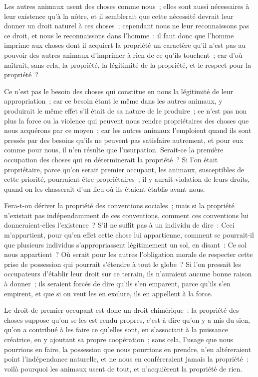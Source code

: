 \documentclass[french,twoside]{book} %
\newcommand\chaptercont{} %
\begin{document}
\chaptercont
\noindent Les autres animaux usent des choses comme nous ; elles sont aussi nécessaires à leur existence qu’à la nôtre, et il semblerait que cette nécessité devrait leur donner un droit naturel à ces choses ; cependant nous ne leur reconnaissons pas ce droit, et nous le reconnaissons dans l’homme : il faut donc que l’homme imprime aux choses dont il acquiert la propriété un caractère qu’il n’est pas au pouvoir des autres animaux d’imprimer à rien de ce qu’ils touchent ; car d’où naîtrait, sans cela, la propriété, la légitimité de la propriété, et le respect pour la propriété ?\par
Ce n’est pas le besoin des choses qui constitue en nous la légitimité de leur appropriation ; car ce besoin étant le même dans les autres animaux, y produirait le même effet s’il était de sa nature de le produire ; ce n’est pas non plus la force ou la violence qui peuvent nous rendre propriétaires des choses que nous acquérons par ce moyen ; car les autres animaux l’emploient quand ils sont pressés par des besoins qu’ils ne peuvent pas satisfaire autrement, et pour eux comme pour nous, il n’en résulte que l’usurpation. Serait-ce la première occupation des choses qui en déterminerait la propriété ? Si l’on était propriétaire, parce qu’on serait premier occupant, les animaux, susceptibles de cette priorité, pourraient être propriétaires ; il y aurait violation de leurs droits, quand on les chasserait d’un lieu où ils étaient établis avant nous.\par
Fera-t-on dériver la propriété des conventions sociales ; mais si la propriété n’existait pas indépendamment de ces conventions, comment ces conventions lui donneraient-elles l’existence ? S’il ne suffit pas à un individu de dire : Ceci m’appartient, pour qu’en effet cette chose lui appartienne, comment se pourrait-il que plusieurs individus s’appropriassent légitimement un sol, en disant : Ce sol nous appartient ? Où serait pour les autres l’obligation morale de respecter cette prise de possession qui pourrait s’étendre à tout le globe ? Si l’on pressait les occupateurs d’établir leur droit sur ce terrain, ils n’auraient aucune bonne raison à donner ; ils seraient forcés de dire qu’ils s’en emparent, parce qu’ils s’en empirent, et que si on veut les en exclure, ils en appellent à la force.\par
Le droit de premier occupant est donc un droit chimérique : la propriété des choses suppose qu’on se les est rendu propres, c’est-à-dire qu’on y a mis du sien, qu’on a contribué à les faire ce qu’elles sont, en s’associant à la puissance créatrice, en y ajoutant sa propre coopération ; sans cela, l’usage que nous pourrions en faire, la possession que nous pourrions en prendre, n’en altéreraient point l’indépendance naturelle, et ne nous en conféreraient jamais la propriété : voilà pourquoi les animaux usent de tout, et n’acquièrent la propriété de rien.\par
\end{document}
